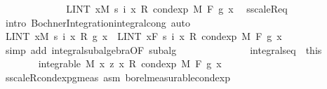 \begin{isabellebody}
\ \ \ \ \ \ \ \ \isamarkupfalse%
\ \isamarkupfalse%
\ {\isachardoublequoteopen}{\isachardot}{\kern0pt}{\isachardot}{\kern0pt}{\isachardot}{\kern0pt}\ {\isacharequal}{\kern0pt}\ LINT\ x{\isacharbar}{\kern0pt}M{\isachardot}{\kern0pt}\ s\ i\ x\ {\isacharasterisk}{\kern0pt}\isactrlsub R\ cond{\isacharunderscore}{\kern0pt}exp\ M\ F\ g\ x{\isachardoublequoteclose}\ \isamarkupfalse%
\ s{\isacharunderscore}{\kern0pt}scaleR{\isacharunderscore}{\kern0pt}eq\ \isamarkupfalse%
\ {\isacharparenleft}{\kern0pt}intro\ Bochner{\isacharunderscore}{\kern0pt}Integration{\isachardot}{\kern0pt}integral{\isacharunderscore}{\kern0pt}cong{\isacharparenright}{\kern0pt}\ auto\isanewline
\ \ \ \ \ \ \ \ \isamarkupfalse%
\ \isamarkupfalse%
\ {\isachardoublequoteopen}LINT\ x{\isacharbar}{\kern0pt}M{\isachardot}{\kern0pt}\ s\ i\ x\ {\isacharasterisk}{\kern0pt}\isactrlsub R\ g\ x\ {\isacharequal}{\kern0pt}\ LINT\ x{\isacharbar}{\kern0pt}{\isacharquery}{\kern0pt}F{\isachardot}{\kern0pt}\ s\ i\ x\ {\isacharasterisk}{\kern0pt}\isactrlsub R\ cond{\isacharunderscore}{\kern0pt}exp\ M\ F\ g\ x{\isachardoublequoteclose}\ \isamarkupfalse%
\ {\isacharparenleft}{\kern0pt}simp\ add{\isacharcolon}{\kern0pt}\ integral{\isacharunderscore}{\kern0pt}subalgebra{}{\isacharbrackleft}{\kern0pt}OF\ subalg{\isacharbrackright}{\kern0pt}{\isacharparenright}{\kern0pt}\isanewline
\ \ \ \ \ \ \isacommand{{\isacharbraceright}{\kern0pt}}\isamarkupfalse%
\isanewline
\ \ \ \ \ \ \isamarkupfalse%
\ integral{\isacharunderscore}{\kern0pt}s{\isacharunderscore}{\kern0pt}eq\ {\isacharequal}{\kern0pt}\ this\isanewline
\isanewline
\ \ \ \ \ \ \isanewline
\isanewline
\ \ \ \ \ \ \isamarkupfalse%
\ {\isachardoublequoteopen}integrable\ M\ {\isacharparenleft}{\kern0pt}{\isasymlambda}x{\isachardot}{\kern0pt}\ z\ x\ {\isacharasterisk}{\kern0pt}\isactrlsub R\ cond{\isacharunderscore}{\kern0pt}exp\ M\ F\ g\ x{\isacharparenright}{\kern0pt}{\isachardoublequoteclose}\ \isamarkupfalse%
\ s{\isacharunderscore}{\kern0pt}scaleR{\isacharunderscore}{\kern0pt}cond{\isacharunderscore}{\kern0pt}exp{\isacharunderscore}{\kern0pt}g{\isacharunderscore}{\kern0pt}meas\ asm{\isacharparenleft}{\kern0pt}{}{\isacharparenright}{\kern0pt}\ borel{\isacharunderscore}{\kern0pt}measurable{\isacharunderscore}{\kern0pt}cond{\isacharunderscore}{\kern0pt}exp{\isacharprime}{\kern0pt}\ \isamarkupfalse%

\end{isabellebody}
